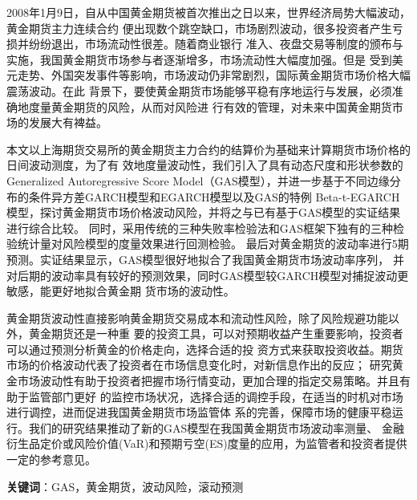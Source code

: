 ﻿\begin{cabstract}
  \renewcommand{\chapterlabel}{摘\hspace{2em}要}

 2008年1月9日，自从中国黄金期货被首次推出之日以来，世界经济局势大幅波动，黄金期货主力连续合约
便出现数个跳空缺口，市场剧烈波动，很多投资者产生亏损并纷纷退出，市场流动性很差。随着商业银行
准入、夜盘交易等制度的颁布与实施，我国黄金期货市场参与者逐渐增多，市场流动性大幅度加强。但是
受到美元走势、外国突发事件等影响，市场波动仍非常剧烈，国际黄金期货市场价格大幅震荡波动。在此
背景下，要使黄金期货市场能够平稳有序地运行与发展，必须准确地度量黄金期货的风险，从而对风险进
行有效的管理，对未来中国黄金期货市场的发展大有裨益。

本文以上海期货交易所的黄金期货主力合约的结算价为基础来计算期货市场价格的日间波动测度，为了有
效地度量波动性，我们引入了具有动态尺度和形状参数的Generalized Autoregressive Score Model（GAS模型），并进一步基于不同边缘分布的条件异方差GARCH模型和EGARCH模型以及GAS的特例
Beta-t-EGARCH模型，探讨黄金期货市场价格波动风险，并将之与已有基于GAS模型的实证结果进行综合比较。
同时，采用传统的三种失败率检验法和GAS框架下独有的三种检验统计量对风险模型的度量效果进行回测检验。
最后对黄金期货的波动率进行5期预测。实证结果显示，GAS模型很好地拟合了我国黄金期货市场波动率序列，
并对后期的波动率具有较好的预测效果，同时GAS模型较GARCH模型对捕捉波动更敏感，能更好地拟合黄金期
货市场的波动性。

黄金期货波动性直接影响黄金期货交易成本和流动性风险，除了风险规避功能以外，黄金期货还是一种重
要的投资工具，可以对预期收益产生重要影响，投资者可以通过预测分析黄金的价格走向，选择合适的投
资方式来获取投资收益。期货市场的价格波动代表了投资者在市场信息变化时，对新信息作出的反应； 
研究黄金市场波动性有助于投资者把握市场行情变动，更加合理的指定交易策略。并且有助于监管部门更好
的监控市场状况，选择合适的调控手段，在适当的时机对市场进行调控，进而促进我国黄金期货市场监管体
系的完善，保障市场的健康平稳运行。我们的研究结果推动了新的GAS模型在我国黄金期货市场波动率测量、
金融衍生品定价或风险价值(VaR)和预期亏空(ES)度量的应用，为监管者和投资者提供一定的参考意见。 
  
  \bigbreak

  {\bfseries 关键词}：GAS，黄金期货，波动风险，滚动预测
   

\end{cabstract}




